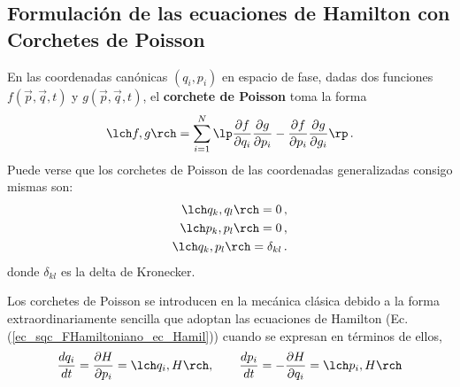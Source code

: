     \subsection{Formulación de las ecuaciones de Hamilton con Corchetes de Poisson}

        En las coordenadas canónicas $(q_i,p_i)$ en espacio de fase, dadas dos funciones $f(\vec{p}, \vec{q}, t)$ y $g(\vec{p}, \vec{q},t)$, el \textbf{corchete de Poisson} toma la forma
        \begin{equation}
            \lch f, g \rch = \sum_{i=1}^{N} \lp \frac{\partial f}{\partial q_i} \frac{\partial g}{\partial p_i} - \frac{\partial f}{\partial p_i} \frac{\partial g}{\partial g_i}   \rp \, .
        \end{equation}
        Puede verse que los corchetes de Poisson de las coordenadas generalizadas consigo mismas son:
        \begin{equation} \label{ec_sqc_Poisson_corchetes_coordenadas}
            \begin{aligned}
                \lch q_k, q_l \rch = 0\,, \\
                \lch p_k, p_l \rch = 0\,, \\
                \lch q_k, p_l \rch = \delta_{kl} \,.
            \end{aligned}
        \end{equation}
        donde $\delta_{kl}$ es la delta de Kronecker.

        Los corchetes de Poisson se introducen en la mecánica clásica debido a la forma extraordinariamente sencilla que adoptan las ecuaciones de Hamilton (Ec. (\ref{ec_sqc_FHamiltoniano_ec_Hamil})) cuando se expresan en términos de ellos,
        \begin{equation} \label{ec_sqc_Poisson_Hamilton_ec}
            \frac{d q_i}{dt} = \frac{\partial H}{\partial p_i} = \lch q_i, H \rch , \qquad
            \frac{d p_i}{dt} = - \frac{\partial H}{\partial q_i} = \lch p_i, H \rch
        \end{equation}

